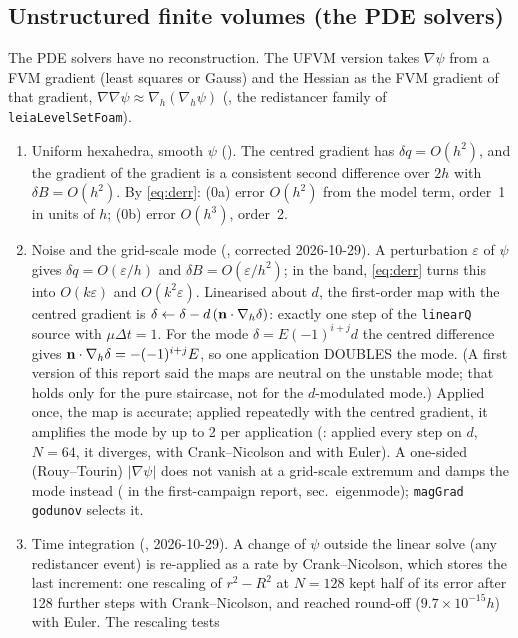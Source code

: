 \subsection{Unstructured finite volumes (the PDE solvers)}
\label{sec:rescaling-fvm}

The PDE solvers have no reconstruction. The UFVM version takes $\nabla\psi$ from a FVM gradient
(least squares or Gauss) and the Hessian as the FVM gradient of that gradient,
$\nabla\nabla\psi\approx\nabla_h(\nabla_h\psi)$ (, the redistancer
family of \texttt{leiaLevelSetFoam}).

\begin{enumerate}
\item Uniform hexahedra, smooth $\psi$ (\Der). The centred gradient has $\delta q=O(h^2)$, and
the gradient of the gradient is a consistent second difference over $2h$ with $\delta B=O(h^2)$.
By \eqref{eq:derr}: (0a) error $O(h^2)$ from the model term, order~1 in units of $h$; (0b)
error $O(h^3)$, order~2.
\item Noise and the grid-scale mode (\Der, corrected 2026-10-29). A perturbation $\varepsilon$
of $\psi$ gives $\delta q=O(\varepsilon/h)$ and $\delta B=O(\varepsilon/h^2)$; in the band,
\eqref{eq:derr} turns this into $O(k\varepsilon)$ and $O(k^2\varepsilon)$. Linearised about $d$,
the first-order map with the centred gradient is $\delta\leftarrow\delta-d\,(\mathbf{n}\cdot\nabla_h\delta)$:
exactly one step of the \texttt{linearQ} source with $\mu\Delta t=1$. For the mode
$\delta=E(-1)^{i+j}d$ the centred difference gives $\mathbf{n}\cdot\nabla_h\delta=-(-1)^{i+j}E$, so one
application DOUBLES the mode. (A first version of this report said the maps are neutral on the
unstable mode; that holds only for the pure staircase, not for the $d$-modulated mode.) Applied
once, the map is accurate; applied repeatedly with the centred gradient, it amplifies the mode by
up to 2 per application (\Meas: applied every step on $d$, $N=64$, it diverges, with
Crank--Nicolson and with Euler). A one-sided (Rouy--Tourin) $|\nabla\psi|$ does not vanish at a
grid-scale extremum and damps the mode instead (\Der{} in the first-campaign report,
sec.~eigenmode); \texttt{magGrad godunov} selects it.
\item Time integration (\Meas, 2026-10-29). A change of $\psi$ outside the linear solve (any
redistancer event) is re-applied as a rate by Crank--Nicolson, which stores the last increment:
one rescaling of $r^2-R^2$ at $N=128$ kept half of its error after 128 further steps with
Crank--Nicolson, and reached round-off ($9.7\times10^{-15}h$) with Euler. The rescaling tests

\end{enumerate}
